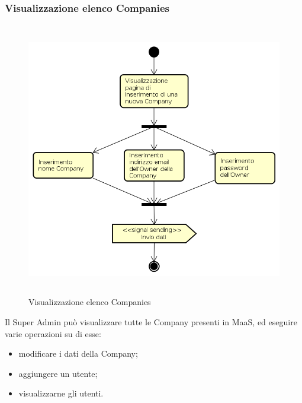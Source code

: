 \subsubsection{Visualizzazione elenco Companies}
\begin{figure}[H]
\begin{center}
\includegraphics[height=12cm]{res/sections/backend/activities/creazioneCompanySA.png}
\caption{Visualizzazione elenco Companies}
\end{center}
\end{figure}
Il Super Admin può visualizzare tutte le Company presenti in MaaS, ed eseguire varie operazioni su di esse:
\begin{itemize}
\item modificare i dati della Company;
\item aggiungere un utente;
\item visualizzarne gli utenti.
\end{itemize}
\newpage
